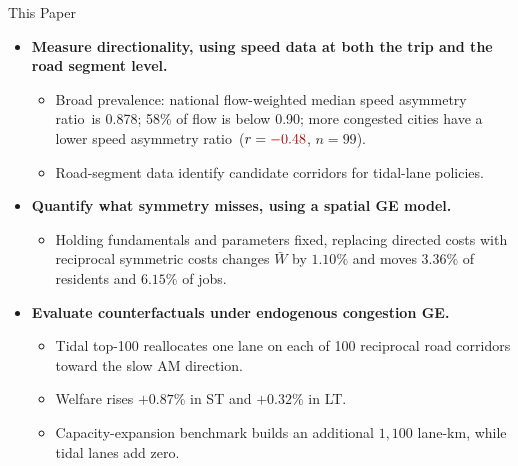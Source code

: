 \documentclass[11pt,aspectratio=169]{beamer}
\newcommand{\good}[1]{\textcolor{blue!70!black}{#1}}
\newcommand{\bad}[1]{\textcolor{red!70!black}{#1}}
\newcommand{\SAR}{speed asymmetry ratio}
\begin{document}
\begin{frame}{This Paper}
\small
\begin{itemize}
  \item \textbf{Measure directionality, using speed data at both the trip and the road segment level.}
  \begin{itemize}\footnotesize
    \item Broad prevalence: national flow-weighted median \SAR\ is \good{0.878}; \good{58\%} of flow is below 0.90; more congested cities have a lower \SAR\ ($r=\bad{-0.48}$, $n=99$).
    \item Road-segment data identify candidate corridors for tidal-lane policies.
  \end{itemize}
  \item \textbf{Quantify what symmetry misses, using a spatial GE model.}
  \begin{itemize}\footnotesize
    \item Holding fundamentals and parameters fixed, replacing directed costs with reciprocal symmetric costs changes $\bar W$ by \good{$1.10\%$} and moves \good{$3.36\%$} of residents and \good{$6.15\%$} of jobs.
  \end{itemize}
  \item \textbf{Evaluate counterfactuals under endogenous congestion GE.}
  \begin{itemize}\footnotesize
    \item Tidal top-100 reallocates one lane on each of 100 reciprocal road corridors toward the slow AM direction.
    \item Welfare rises \good{$+0.87\%$} in ST and \good{$+0.32\%$} in LT.
    \item Capacity-expansion benchmark builds an additional \good{$1{,}100$ lane-km}, while tidal lanes add \good{zero}.
  \end{itemize}
\end{itemize}
\end{frame}
\end{document}
